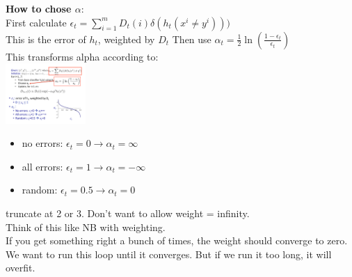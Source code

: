 \textbf{How to chose $\alpha$}: \hfill \\
First calculate $\displaystyle  \epsilon_t = \sum_{i=1}^m D_t(i) \delta(h_t(x^i \neq y^i)))$ \hfill \\
This is the error of $h_t$, weighted by $D_t$
Then use $\displaystyle  \alpha_t = \frac{1}{2} \ln \left( \frac{1 - \epsilon_t}{\epsilon_t} \right)$  \hfill \\
This transforms alpha according to:  \hfill \\
\includegraphics[width=1.2in]{figures/alpha_from_epsilon.pdf}
\begin{itemize}
	\item no errors:  $\epsilon_t = 0 \rightarrow \alpha_t = \infty$
	\item all errors:  $\epsilon_t = 1 \rightarrow \alpha_t = -\infty$
	\item random:  $\epsilon_t = 0.5 \rightarrow \alpha_t = 0$
\end{itemize}
truncate at 2 or 3.  Don't want to allow weight = infinity. \hfill \\  %
Think of this like NB with weighting. \hfill \\  %

If you get something right a bunch of times, the weight should converge to zero.  %
\hfill \\

We want to run this loop until it converges.  
But if we run it too long, it will overfit. 
